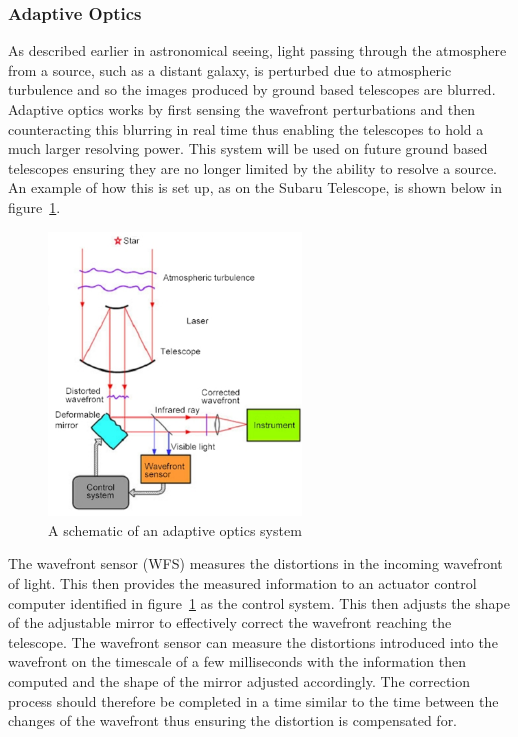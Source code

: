 		\subsubsection{Adaptive Optics} %
		\label{ssub:adaptive_optics}
			As described earlier in astronomical seeing, light passing through the atmosphere from a source, such as a distant galaxy, is perturbed due to atmospheric turbulence and so the images produced by ground based telescopes are blurred. Adaptive optics works by first sensing the wavefront perturbations and then counteracting this blurring in real time thus enabling the telescopes to hold a much larger resolving power. This system will be used on future ground based telescopes ensuring they are no longer limited by the ability to resolve a source. An example of how this is set up, as on the Subaru Telescope, is shown below in figure~\ref{fig:AdaptiveOptics}.
			\begin{figure}[ht]
				\centering
				\includegraphics[width=0.6\textwidth]{../Images/AdaptiveOptics.png}
				\caption{A schematic of an adaptive optics system}\label{fig:AdaptiveOptics}
			\end{figure}

			The wavefront sensor (WFS) measures the distortions in the incoming wavefront of light. This then provides the measured information to an actuator control computer identified in figure~\ref{fig:AdaptiveOptics} as the control system. This then adjusts the shape of the adjustable mirror to effectively correct the wavefront reaching the telescope\cite{Diffraction_Limited_Imaging_Saha}.  The wavefront sensor can measure the distortions introduced into the wavefront on the timescale of a few milliseconds with the information then computed and the shape of the mirror adjusted accordingly. The correction process should therefore be completed in a time similar to the time between the changes of the wavefront thus ensuring the distortion is compensated for.


